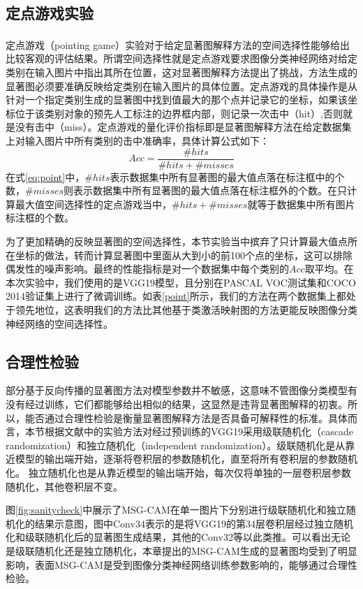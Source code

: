 \subsection{定点游戏实验}
定点游戏（pointing game）\textsuperscript{\cite{zhang2018top}}实验对于给定显著图解释方法的空间选择性能够给出比较客观的评估结果。所谓空间选择性就是定点游戏要求图像分类神经网络对给定类别在输入图片中指出其所在位置，这对显著图解释方法提出了挑战，方法生成的显著图必须要准确反映给定类别在输入图片的具体位置。定点游戏的具体操作是从针对一个指定类别生成的显著图中找到值最大的那个点并记录它的坐标，如果该坐标位于该类别对象的预先人工标注的边界框内部，则记录一次击中（hit）,否则就是没有击中（miss）。定点游戏的量化评价指标即是显著图解释方法在给定数据集上对输入图片中所有类别的击中准确率，具体计算公式如下：
\begin{equation}
	Acc=\frac{\#hits}{\#hits+\#misses}
\label{eq:point}
\end{equation}
在式\ref{eq:point}中，$\#hits$表示数据集中所有显著图的最大值点落在标注框中的个数，$\#misses$则表示数据集中所有显著图的最大值点落在标注框外的个数。在只计算最大值空间选择性的定点游戏当中，$\#hits+\#misses$就等于数据集中所有图片标注框的个数。

为了更加精确的反映显著图的空间选择性，本节实验当中摈弃了只计算最大值点所在坐标的做法，转而计算显著图中里面从大到小的前100个点的坐标，这可以排除偶发性的噪声影响。最终的性能指标是对一个数据集中每个类别的$Acc$取平均。在本次实验中，我们使用的是VGG19模型，且分别在PASCAL VOC测试集和COCO 2014验证集上进行了微调训练。如表\ref{point}所示，我们的方法在两个数据集上都处于领先地位，这表明我们的方法比其他基于类激活映射图的方法更能反映图像分类神经网络的空间选择性。

\subsection{合理性检验}
部分基于反向传播的显著图方法对模型参数并不敏感，这意味不管图像分类模型有没有经过训练，它们都能够给出相似的结果，这显然是违背显著图解释的初衷。所以，能否通过合理性检验是衡量显著图解释方法是否具备可解释性的标准。具体而言，本节根据文献\cite{adebayo2018sanity}中的实验方法对经过预训练的VGG19采用级联随机化（cascade randomization）和独立随机化（independent randomization）。级联随机化是从靠近模型的输出端开始，逐渐将卷积层的参数随机化，直至将所有卷积层的参数随机化。 独立随机化也是从靠近模型的输出端开始，每次仅将单独的一层卷积层参数随机化，其他卷积层不变。

图\ref{fig:sanitycheck}中展示了MSG-CAM在单一图片下分别进行级联随机化和独立随机化的结果示意图，图中Conv34表示的是将VGG19的第34层卷积层经过独立随机化和级联随机化后的显著图生成结果，其他的Conv32等以此类推。可以看出无论是级联随机化还是独立随机化，本章提出的MSG-CAM生成的显著图均受到了明显影响，表面MSG-CAM是受到图像分类神经网络训练参数影响的，能够通过合理性检验。

